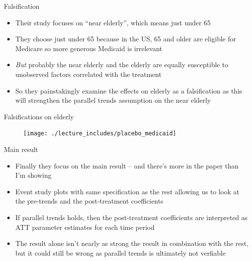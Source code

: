 \documentclass{beamer}
\begin{document}



\begin{frame}{Falsification}

\begin{itemize}

\item Their study focuses on ``near elderly'', which means just under 65
\item They choose just under 65 because in the US, 65 and older are eligible for Medicare so more generous Medicaid is irrelevant
\item \emph{But} probably the near elderly and the elderly are equally susceptible to unobserved factors correlated with the treatment
\item So they painstakingly examine the effects on elderly as a falsification as this will strengthen the parallel trends assumption on the near elderly
\end{itemize}

\end{frame}

\begin{frame}{Falsifications on elderly}

	\begin{figure}
\texttt{[image: ./lecture\_includes/placebo\_medicaid]}
	\end{figure}

\end{frame}

\begin{frame}{Main result}

\begin{itemize}

\item Finally they focus on the main result -- and there's more in the paper than I'm showing
\item Event study plots with same specification as the rest allowing us to look at the pre-trends and the post-treatment coefficients
\item If parallel trends holds, then the post-treatment coefficients are interpreted as ATT parameter estimates for each time period
\item The result alone isn't nearly as strong the result in combination with the rest, but it could still be wrong as parallel trends is ultimately not verfiable
\end{itemize}

\end{frame}
\end{document}
